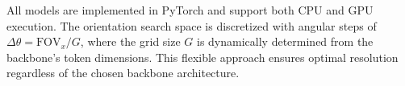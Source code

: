 \documentclass{bmvc2k}
\begin{document}
All models are implemented in PyTorch and support both CPU and GPU execution. The orientation search space is discretized with angular steps of $\Delta\theta = \text{FOV}_x / G$, where the grid size $G$ is dynamically determined from the backbone's token dimensions. This flexible approach ensures optimal resolution regardless of the chosen backbone architecture.


\end{document}
